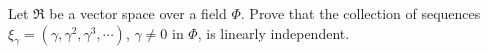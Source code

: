 Let $\mathfrak{R}$ be a vector space over a field $\Phi$. Prove that the collection of sequences $\xi_\gamma = (\gamma, \gamma^2, \gamma^3, \cdots)$, $\gamma \neq 0$ in $\Phi$, is linearly independent.
